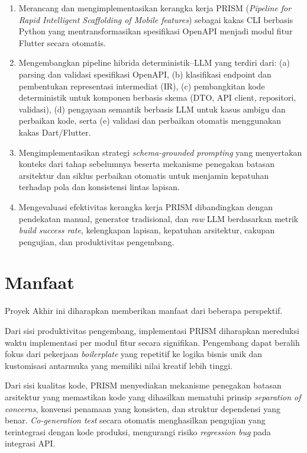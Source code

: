 \begin{enumerate}
    \item Merancang dan mengimplementasikan kerangka kerja PRISM (\textit{Pipeline for Rapid Intelligent Scaffolding of Mobile features}) sebagai kakas CLI berbasis Python yang mentransformasikan spesifikasi OpenAPI menjadi modul fitur Flutter secara otomatis.
    
    \item Mengembangkan pipeline hibrida deterministik--LLM yang terdiri dari: (a) parsing dan validasi spesifikasi OpenAPI, (b) klasifikasi endpoint dan pembentukan representasi intermediat (IR), (c) pembangkitan kode deterministik untuk komponen berbasis skema (DTO, API client, repositori, validasi), (d) pengayaan semantik berbasis LLM untuk kasus ambigu dan perbaikan kode, serta (e) validasi dan perbaikan otomatis menggunakan kakas Dart/Flutter.
    
    \item Mengimplementasikan strategi \textit{schema-grounded prompting} yang menyertakan konteks dari tahap sebelumnya beserta mekanisme penegakan batasan arsitektur dan siklus perbaikan otomatis untuk menjamin kepatuhan terhadap pola dan konsistensi lintas lapisan.
    
    \item Mengevaluasi efektivitas kerangka kerja PRISM dibandingkan dengan pendekatan manual, generator tradisional, dan \textit{raw} LLM berdasarkan metrik \textit{build success rate}, kelengkapan lapisan, kepatuhan arsitektur, cakupan pengujian, dan produktivitas pengembang.
\end{enumerate}

\section{Manfaat}

Proyek Akhir ini diharapkan memberikan manfaat dari beberapa perspektif.

Dari sisi produktivitas pengembang, implementasi PRISM diharapkan mereduksi waktu implementasi per modul fitur secara signifikan. Pengembang dapat beralih fokus dari pekerjaan \textit{boilerplate} yang repetitif ke logika bisnis unik dan kustomisasi antarmuka yang memiliki nilai kreatif lebih tinggi.

Dari sisi kualitas kode, PRISM menyediakan mekanisme penegakan batasan arsitektur yang memastikan kode yang dihasilkan mematuhi prinsip \textit{separation of concerns}, konvensi penamaan yang konsisten, dan struktur dependensi yang benar. \textit{Co-generation test} secara otomatis menghasilkan pengujian yang terintegrasi dengan kode produksi, mengurangi risiko \textit{regression bug} pada integrasi API.

